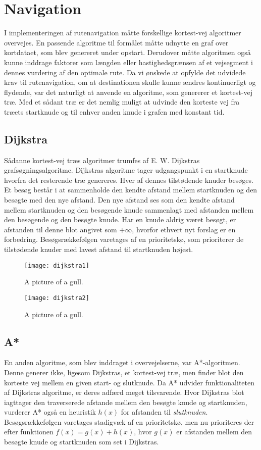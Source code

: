 \section{Navigation}
\label{sec:navigation}
I implementeringen af rutenavigation måtte forskellige kortest-vej algoritmer overvejes. En passende algoritme til formålet måtte udnytte en graf over kortdataet, som blev genereret under opstart. Derudover måtte algoritmen også kunne inddrage faktorer som længden eller hastighedsgrænsen af et vejsegment i dennes vurdering af den optimale rute. Da vi ønskede at opfylde det udvidede krav til rutenavigation, om at destinationen skulle kunne ændres kontinuerligt og flydende, var det naturligt at anvende en algoritme, som genererer et kortest-vej træ. Med et sådant træ er det nemlig muligt at udvinde den korteste vej fra træets startknude og til enhver anden knude i grafen med konstant tid.

\subsection{Dijkstra}
\label{subsec:dijkstra}
Sådanne kortest-vej træs algoritmer trumfes af E. W. Dijkstras grafsøgningsalgoritme. Dijkstras algoritme tager udgangspunkt i en startknude hvorfra det resterende træ genereres. Hver af dennes tilstødende knuder besøges. Et besøg består i at sammenholde den kendte afstand mellem startknuden og den besøgte med den nye afstand. Den nye afstand ses som den kendte afstand mellem startknuden og den besøgende knude sammenlagt med afstanden mellem den besøgende og den besøgte knude. Har en knude aldrig været besøgt, er afstanden til denne blot angivet som $+\infty$, hvorfor ethvert nyt forslag er en forbedring. Besøgsrækkefølgen varetages af en prioritetskø, som prioriterer de tilstødende knuder med lavest afstand til startknuden højest.

\begin{figure}[h]
  	\centering
    \texttt{[image: dijkstra1]}
	\caption{A picture of a gull.}
\end{figure}

\begin{figure}[h]
  	\centering
    \texttt{[image: dijkstra2]}
	\caption{A picture of a gull.}
\end{figure}

\subsection{A*}
\label{subsec:astar}
En anden algoritme, som blev inddraget i overvejelserne, var A*-algoritmen. Denne generer ikke, ligesom Dijkstras, et kortest-vej træ, men finder blot den korteste vej mellem en given start- og slutknude. Da A* udvider funktionaliteten af Dijkstras algoritme, er deres adfærd meget tilsvarende. Hvor Dijkstras blot iagttager den traverserede afstande mellem den besøgte knude og startknuden, vurderer A* også en heuristik $h(x)$ for afstanden til \emph{slutknuden}. Besøgsrækkefølgen varetages stadigvæk af en prioritetskø, men nu prioriteres der efter funktionen $f(x)=g(x)+h(x)$, hvor $g(x)$ er afstanden mellem den besøgte knude og startknuden som set i Dijkstras.

